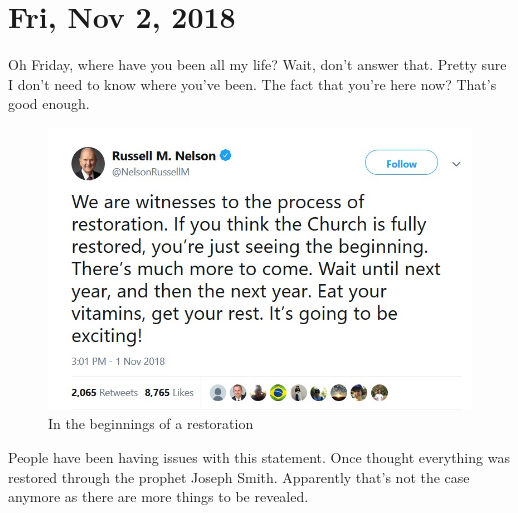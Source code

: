 \section{Fri, Nov 2, 2018}

Oh Friday, where have you been all my life? Wait, don't answer that. Pretty sure I
don't need to know where you've been. The fact that you're here now? That's good
enough.

\begin{figure}[h!]
  \centering
  \includegraphics[width=1\linewidth]{2018/images/restoration.jpg}
  \caption{In the beginnings of a restoration}
  \label{fig:restoration}
\end{figure}

People have been having issues with this statement. Once thought everything was
restored through the prophet Joseph Smith. Apparently that's not the case anymore as
there are more things to be revealed.